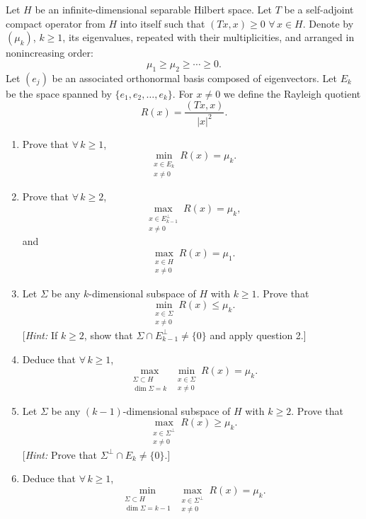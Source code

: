 \documentclass[12pt]{article}
\newcommand{\abs}[1]{\left|#1\right|}
\begin{document}
\medskip
 
Let $H$ be an infinite-dimensional separable Hilbert space. Let $T$ be a self-adjoint
compact operator from $H$ into itself such that $(Tx,x) \ge 0$ $\forall\, x \in H$. Denote by
$(\mu_k)$, $k \ge 1$, its eigenvalues, repeated with their multiplicities, and arranged in
nonincreasing order:
\[
\mu_1 \ge \mu_2 \ge \cdots \ge 0.
\]
Let $(e_j)$ be an associated orthonormal basis composed of eigenvectors. Let $E_k$ be
the space spanned by $\{e_1, e_2, \ldots, e_k\}$. For $x \neq 0$ we define the Rayleigh quotient
\[
R(x) = \frac{(Tx,x)}{\abs{x}^2}.
\]
 
\begin{enumerate}
\item Prove that $\forall\, k \ge 1$,
\[
\min_{\substack{x \in E_k \\ x \neq 0}} R(x) = \mu_k.
\]
 
\item Prove that $\forall\, k \ge 2$,
\[
\max_{\substack{x \in E_{k-1}^\perp \\ x \neq 0}} R(x) = \mu_k,
\]
and
\[
\max_{\substack{x \in H \\ x \neq 0}} R(x) = \mu_1.
\]
 
\item Let $\Sigma$ be any $k$-dimensional subspace of $H$ with $k \ge 1$. Prove that
\[
\min_{\substack{x \in \Sigma \\ x \neq 0}} R(x) \le \mu_k.
\]
[\textit{Hint:} If $k \ge 2$, show that $\Sigma \cap E_{k-1}^\perp \neq \{0\}$ and apply question 2.]
 
\item Deduce that $\forall\, k \ge 1$,
\[
\max_{\substack{\Sigma \subset H \\ \dim\Sigma = k}} \min_{\substack{x \in \Sigma \\ x \neq 0}} R(x) = \mu_k.
\]
 
\item Let $\Sigma$ be any $(k-1)$-dimensional subspace of $H$ with $k \ge 2$. Prove that
\[
\max_{\substack{x \in \Sigma^\perp \\ x \neq 0}} R(x) \ge \mu_k.
\]
[\textit{Hint:} Prove that $\Sigma^\perp \cap E_k \neq \{0\}$.]
 
\item Deduce that $\forall\, k \ge 1$,
\[
\min_{\substack{\Sigma \subset H \\ \dim\Sigma = k-1}} \max_{\substack{x \in \Sigma^\perp \\ x \neq 0}} R(x) = \mu_k.
\]
 

\end{enumerate}
\end{document}

